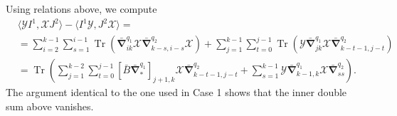 \documentclass{amsart}
\theoremstyle{definition}
\theoremstyle{remark}
\numberwithin{equation}{section}
\numberwithin{theorem}{section}
\begin{document}
Using relations above, we compute
\begin{equation*}
\begin{aligned}
&\langle {{\mathcal Y}} I^1,{{\mathcal X}} J^2\rangle  - \langle I^1{{\mathcal Y}}, J^2{{\mathcal X}}\rangle    =\\
&
= \sum_{i=2}^{k-1} \sum_{s=1}^{i-1}{\operatorname{Tr}}\left( \bar{\boldsymbol\nabla}_{ik}^{q_1} {{\mathcal X}}
\bar{\boldsymbol\nabla}_{k-s,i-s}^{q_2} {{\mathcal X}}\right) +
\sum_{j=1}^{k-1} \sum_{t=0}^{j-1} {\operatorname{Tr}}\left({{\mathcal Y}}\bar{\boldsymbol\nabla}_{jk}^{q_1} {{\mathcal X}}
\bar{\boldsymbol\nabla}_{k-t-1,j-t}^{q_2}\right) \\
&= {\operatorname{Tr}}\left(\sum_{j=1}^{k-2} \sum_{t=0}^{j-1}
[\bar B\bar {\boldsymbol\nabla}^{q_1}_*]_{j+1,k}
{{\mathcal X}} \bar{\boldsymbol\nabla}_{k-t-1,j-t}^{q_2}  +
\sum_{s=1}^{k-1} {{\mathcal Y}}\bar{\boldsymbol\nabla}_{k-1,k}^{q_1} {{\mathcal X}} \bar{\boldsymbol\nabla}_{ss}^{q_2}\right ). 
\end{aligned}
\end{equation*}
The argument identical to the one used in Case 1 shows that the inner double sum  above vanishes. 
\end{document}
